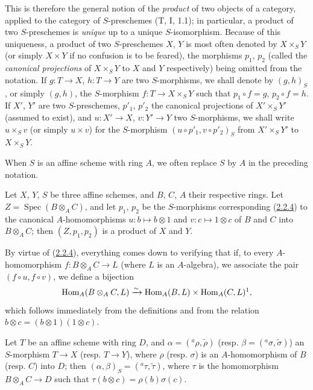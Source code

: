 This is therefore the general notion of the \emph{product} of two objects of a
category, applied to the category of $S$-preschemes (T, I, 1.1); in
particular, a product of two $S$-preschemes is \emph{unique} up to a unique
$S$-isomorphism. Because of this uniqueness, a product of two $S$-preschemes
$X$, $Y$ is most often denoted by
$X\times_S Y$ (or simply $X\times Y$ if no confusion is to be feared),
the morphisms $p_1$, $p_2$ (called the \emph{canonical projections} of
$X\times_S Y$ to $X$ and $Y$ respectively) being omitted from the notation.
If $g:T\to X$, $h:T\to Y$ are two $S$-morphisms, we shall denote by
$(g,h)_S$, or simply $(g,h)$, the $S$-morphism
$f:T\to X\times_S Y$ such that $p_1\circ f=g$, $p_2\circ f=h$. If $X'$, $Y'$
are two $S$-preschemes, $p'_1$, $p'_2$ the canonical projections of
$X'\times_S Y'$ (assumed to exist), and $u:X'\to X$, $v:Y'\to Y$ two
$S$-morphisms, we shall write $u\times_S v$ (or simply $u\times v$) for the
$S$-morphism $(u\circ p'_1,v\circ p'_2)_S$ from $X'\times_S Y'$ to
$X\times_S Y$.

When $S$ is an affine scheme with ring $A$, we often replace $S$ by $A$
in the preceding notation.

\begin{proposition}[3.2.2]
\label{I.3.2.2}
Let $X$, $Y$, $S$ be three affine schemes, and $B$, $C$, $A$ their respective
rings. Let $Z=\operatorname{Spec}(B\otimes_A C)$, and let $p_1$, $p_2$ be the
$S$-morphisms corresponding (\hyperref[I.2.2.4]{2.2.4}) to the
canonical $A$-homomorphisms $u:b\mapsto b\otimes1$ and
$v:c\mapsto1\otimes c$ of $B$ and $C$ into $B\otimes_A C$; then
$(Z,p_1,p_2)$ is a product of $X$ and $Y$.
\end{proposition}

By virtue of (\hyperref[I.2.2.4]{2.2.4}), everything comes down to verifying
that if, to every $A$-homomorphism $f:B\otimes_A C\to L$ (where $L$ is an
$A$-algebra), we associate the pair $(f\circ u,f\circ v)$, we define a bijection
\[
  \operatorname{Hom}_A(B\otimes_A C,L)\xrightarrow{\sim}
  \operatorname{Hom}_A(B,L)\times\operatorname{Hom}_A(C,L)\footnotemark,
\]
 which follows immediately from the definitions
and from the relation $b\otimes c=(b\otimes1)(1\otimes c)$.

\begin{corollary}[3.2.3]
\label{I.3.2.3}
Let $T$ be an affine scheme with ring $D$, and
$\alpha=({}^a\rho,\widetilde{\rho})$
(resp. $\beta=({}^a\sigma,\widetilde{\sigma})$) an $S$-morphism $T\to X$
(resp. $T\to Y$), where $\rho$ (resp. $\sigma$) is an $A$-homomorphism of $B$
(resp. $C$) into $D$; then
$(\alpha,\beta)_S=({}^a\tau,\widetilde{\tau})$, where $\tau$ is the homomorphism
$B\otimes_A C\to D$ such that $\tau(b\otimes c)=\rho(b)\sigma(c)$.
\end{corollary}


